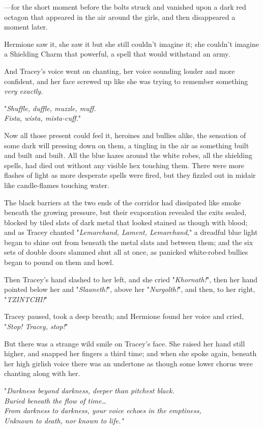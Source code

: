 ---for the short moment before the bolts struck and vanished upon a dark red 
octagon that appeared in the air around the girls, and then disappeared a 
moment later.

Hermione saw it, she saw it but she still couldn't imagine it; she couldn't 
imagine a Shielding Charm that powerful, a spell that would withstand an army.

And Tracey's voice went on chanting, her voice sounding louder and more 
confident, and her face screwed up like she was trying to remember something 
\emph{very exactly}.

"\emph{Shuffle, duffle, muzzle, muff.\\
Fista, wista, mista-cuff.}"

Now all those present could feel it, heroines and bullies alike, the sensation 
of some dark will pressing down on them, a tingling in the air as something 
built and built and built. All the blue hazes around the white robes, all the 
shielding spells, had died out without any visible hex touching them. There 
were more flashes of light as more desperate spells were fired, but they 
fizzled out in midair like candle-flames touching water.

The black barriers at the two ends of the corridor had dissipated like smoke 
beneath the growing pressure, but their evaporation revealed the exits sealed, 
blocked by tiled slats of dark metal that looked stained as though with blood; 
and as Tracey chanted "\emph{Lemarchand, Lament, Lemarchand}," a dreadful blue 
light began to shine out from beneath the metal slats and between them; and the 
six sets of double doors slammed shut all at once, as panicked white-robed 
bullies began to pound on them and howl.

Then Tracey's hand slashed to her left, and she cried "\emph{Khornath!}", then 
her hand pointed below her and "\emph{Slaaneth!}", above her 
"\emph{Nurgolth!}", and then, to her right, "\emph{TZINTCHI!}"

Tracey paused, took a deep breath; and Hermione found her voice and cried, 
"\emph{Stop! Tracey, stop!}"

But there was a strange wild smile on Tracey's face. She raised her hand still 
higher, and snapped her fingers a third time; and when she spoke again, beneath 
her high girlish voice there was an undertone as though some lower chorus were 
chanting along with her.

"\emph{Darkness beyond darkness, deeper than pitchest black.\\
Buried beneath the flow of time{\ldots}\\
From darkness to darkness, your voice echoes in the emptiness,\\
Unknown to death, nor known to life."\\
}

